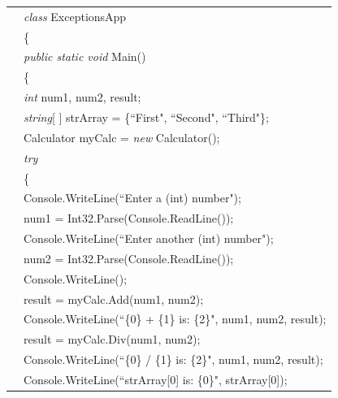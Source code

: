 \begin{program}
\begin{tabular}{ >{\codelinenumfont}c >{\codelistingfont}l}
16 & \hspace{0.2in} \emph{class} ExceptionsApp  \\
17 & \hspace{0.2in} \{  \\
18 & \hspace{0.4in} \emph{public static void} Main()  \\
19 & \hspace{0.4in} \{  \\
20 & \hspace{0.6in} \emph{int} num1, num2, result;  \\
21 & \hspace{0.6in} \emph{string}[ ] strArray = \{``First", ``Second", ``Third"\};  \\
22 & \hspace{0.6in} Calculator myCalc = \emph{new} Calculator();  \\
23 & \hspace{0.6in} \emph{try}  \\
24 & \hspace{0.6in} \{  \\
25 & \hspace{0.8in} Console.WriteLine(``Enter a (int) number");  \\
26 & \hspace{0.8in} num1 = Int32.Parse(Console.ReadLine());  \\
27 & \hspace{0.8in} Console.WriteLine(``Enter another (int) number");  \\
28 & \hspace{0.8in} num2 = Int32.Parse(Console.ReadLine());  \\
29 & \hspace{0.8in} Console.WriteLine();  \\
30 & \hspace{0.8in} result = myCalc.Add(num1, num2);  \\
31 & \hspace{0.8in} Console.WriteLine(``\{0\} + \{1\} is: \{2\}", num1, num2, result);  \\
32 & \hspace{0.8in} result = myCalc.Div(num1, num2);  \\
33 & \hspace{0.8in} Console.WriteLine(``\{0\} / \{1\} is: \{2\}", num1, num2, result);  \\
34 & \hspace{0.8in} Console.WriteLine(``strArray[0] is: \{0\}", strArray[0]);  \\

\end{tabular}
\end{program}
